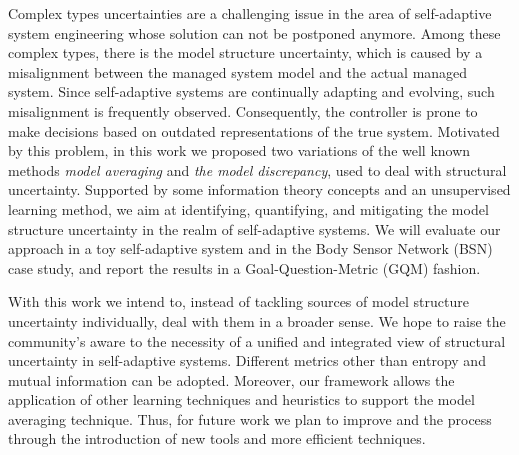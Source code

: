 Complex types uncertainties are a challenging issue in the area of self-adaptive system engineering whose solution can not be postponed anymore. Among these complex types, there is the model structure uncertainty, which is caused by a misalignment between the managed system model and the actual managed system. Since self-adaptive systems are continually adapting and evolving, such misalignment is frequently observed. Consequently, the controller is prone to make decisions based on outdated representations of the true system. Motivated by this problem, in this work we proposed two variations of the well known methods \textit{model averaging} and \textit{the model discrepancy}, used to deal with structural uncertainty. Supported by some information theory concepts and an unsupervised learning method, we aim at identifying, quantifying, and mitigating the model structure uncertainty in the realm of self-adaptive systems. We will evaluate our approach in a toy self-adaptive system and in the Body Sensor Network (BSN) case study, and report the results in a Goal-Question-Metric (GQM) fashion.

With this work we intend to, instead of tackling sources of model structure uncertainty individually, deal with them in a broader sense. We hope to raise the community's aware to the necessity of a unified and integrated view of structural uncertainty in self-adaptive systems. Different metrics other than entropy and mutual information can be adopted. Moreover, our framework allows the application of other learning techniques and heuristics to support the model averaging technique. Thus, for future work we plan to improve and the process through the introduction of new tools and more efficient techniques.